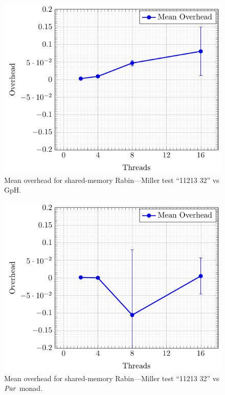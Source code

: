 \documentclass[paper=A4,twoside=true,openright,parskip=full,chapterprefix=true,headings=normal,bibliography=totoc,listof=totoc,titlepage=on,captions=tableabove,draft=false,british]{scrreprt}%
\renewcommand{\enquote}[1]{{``}#1{''}}
\begin{document}
\begin{figure}[h]
\centering
\includegraphics{src/img/overSMRM32GpH.pdf}
\caption{Mean overhead for shared-memory Rabin---Miller test
\enquote{11213 32} vs GpH.\label{fig:overSMRM32GpH}}
\end{figure}

\begin{figure}[h]
\centering
\includegraphics{src/img/overSMRM32Par.pdf}
\caption{Mean overhead for shared-memory Rabin---Miller test
\enquote{11213 32} vs \ensuremath{\Conid{Par}} monad.\label{fig:overSMRM32Par}}
\end{figure}
\end{document}
